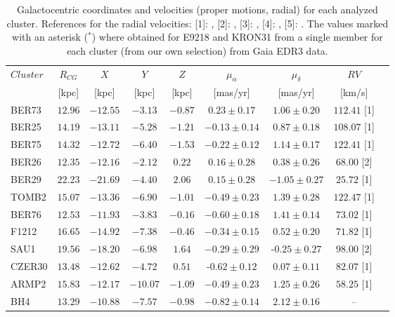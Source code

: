 \documentclass[draft]{aa}
\begin{document}
\begin{appendix}
  \begin{table}
  \caption{Galactocentric coordinates and velocities (proper motions, radial)
  for each analyzed cluster. References for the radial velocities: [1]: 
  \cite{Tarricq_2021}, [2]: \cite{Dias_2002}, [3]: \cite{Soubiran_2018}, [4]: 
  \cite{Dias_2007}, [5]: \cite{Frinchaboy_2006}. The values marked with an
  asterisk ($^*$) where obtained for E9218 and KRON31 from a single member for
  each cluster (from our own selection) from Gaia EDR3 data.}
  \label{tab:velocities}
  \centering
  \renewcommand{\arraystretch}{1.3}
  \begin{tabular}{lcccccccc}
   \hline \hline
   $Cluster$ & $R_{CG}$ & $X$ & $Y$ & $Z$ & $\mu_{\alpha}$ & $\mu_{\delta}$ & $RV$\\
    & [kpc] & [kpc] & [kpc] & [kpc] & [mas/yr] & [mas/yr] & [km/s]\\
   \hline
   BER73 & $12.96$ & $-12.55$ & $-3.13$ & $-0.87$ & $ 0.23 \pm 0.17$ & $ 1.06 \pm 0.20$ & $112.41$ [1] \\
   BER25 & $14.19$ & $-13.11$ & $-5.28$ & $-1.21$ & $- 0.13 \pm 0.14$ & $ 0.87 \pm 0.18$ & $108.07$ [1] \\
   BER75 & $14.32$ & $-12.72$ & $-6.40$ & $-1.53$ & $- 0.22 \pm 0.12$ & $ 1.14 \pm 0.17$ & $122.41$ [1] \\
   BER26 & $12.35$ & $-12.16$ & $-2.12$ & $0.22$ & $ 0.16 \pm 0.28$ & $ 0.38 \pm 0.26$ & $68.00$ [2]\\
   BER29 & $22.23$ & $-21.69$ & $-4.40$ & $2.06$ & $ 0.15 \pm 0.28$ & $- 1.05 \pm 0.27$ & $25.72$ [1]\\
   TOMB2 & $15.07$ & $-13.36$ & $-6.90$ & $-1.01$ & $- 0.49 \pm 0.23$ & $ 1.39 \pm 0.28$ & $122.47$ [1]\\
   BER76 & $12.53$ & $-11.93$ & $-3.83$ & $-0.16$ & $- 0.60 \pm 0.18$ & $ 1.41 \pm 0.14$ & $73.02$ [1]\\
   F1212 & $16.65$ & $-14.92$ & $-7.38$ & $-0.46$ & $- 0.34 \pm 0.15$ & $ 0.52 \pm 0.20$ & $71.82$ [1]\\
   SAU1 & $19.56$ & $-18.20$ & $-6.98$ & $1.64$ & $- 0.29 \pm 0.29$ & -$ 0.25 \pm 0.27$ & $98.00$ [2]\\
   CZER30 & $13.48$ & $-12.62$ & $-4.72$ & $0.51$ & -$ 0.62 \pm 0.12$ & $ 0.07 \pm 0.11$ & $82.07$ [1]\\
   ARMP2 & $15.83$ & $-12.17$ & $-10.07$ & $-1.09$ & $- 0.49 \pm 0.23$ & $ 1.25 \pm 0.26$ & $58.25$ [1]\\
   BH4 & $13.29$ & $-10.88$ & $-7.57$ & $-0.98$ & $- 0.82 \pm 0.14$ & $ 2.12 \pm 0.16$ & -- \\

\end{tabular}
\end{table}
\end{appendix}
\end{document}
